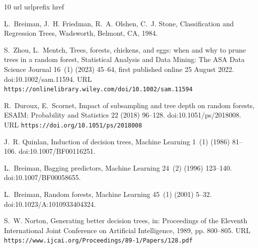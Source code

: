 \documentclass[final,5p,times]{elsarticle}
\begin{document}
\begin{thebibliography}{10}
\expandafter\ifx\csname url\endcsname\relax
  \def\url#1{\texttt{#1}}\fi
\expandafter\ifx\csname urlprefix\endcsname\relax\def\urlprefix{URL }\fi
\expandafter\ifx\csname href\endcsname\relax
  \def\href#1#2{#2} \def\path#1{#1}\fi

L.~Breiman, J.~H. Friedman, R.~A. Olshen, C.~J. Stone, Classification and
  Regression Trees, Wadsworth, Belmont, CA, 1984.

S.~Zhou, L.~Mentch,
  \href{https://onlinelibrary.wiley.com/doi/10.1002/sam.11594}{Trees, forests,
  chickens, and eggs: when and why to prune trees in a random forest},
  Statistical Analysis and Data Mining: The ASA Data Science Journal 16~(1)
  (2023) 45--64, first published online 25 August 2022.
\newblock \href {https://doi.org/10.1002/sam.11594}
  {\path{doi:10.1002/sam.11594}}.
\newline\urlprefix\url{https://onlinelibrary.wiley.com/doi/10.1002/sam.11594}

R.~Duroux, E.~Scornet, \href{https://doi.org/10.1051/ps/2018008}{Impact of
  subsampling and tree depth on random forests}, {ESAIM}: Probability and
  Statistics 22 (2018) 96--128.
\newblock \href {https://doi.org/10.1051/ps/2018008}
  {\path{doi:10.1051/ps/2018008}}.
\newline\urlprefix\url{https://doi.org/10.1051/ps/2018008}

J.~R. Quinlan, Induction of decision trees, Machine Learning 1~(1) (1986)
  81--106.
\newblock \href {https://doi.org/10.1007/BF00116251}
  {\path{doi:10.1007/BF00116251}}.

L.~Breiman, Bagging predictors, Machine Learning 24~(2) (1996) 123--140.
\newblock \href {https://doi.org/10.1007/BF00058655}
  {\path{doi:10.1007/BF00058655}}.

L.~Breiman, Random forests, Machine Learning 45~(1) (2001) 5--32.
\newblock \href {https://doi.org/10.1023/A:1010933404324}
  {\path{doi:10.1023/A:1010933404324}}.

S.~W. Norton,
  \href{https://www.ijcai.org/Proceedings/89-1/Papers/128.pdf}{Generating
  better decision trees}, in: Proceedings of the Eleventh International Joint
  Conference on Artificial Intelligence, 1989, pp. 800--805.
\newline\urlprefix\url{https://www.ijcai.org/Proceedings/89-1/Papers/128.pdf}


\end{thebibliography}
\end{document}
